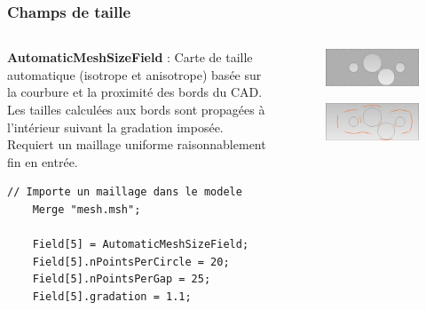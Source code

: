 \documentclass[aspectratio=169]{beamer}
\begin{document}
\begin{frame}[fragile]
\frametitle{Champs de taille}
\begin{columns}
  \begin{column}{0.55\textwidth}
    \footnotesize
    \textbf{AutomaticMeshSizeField} : Carte de taille automatique (isotrope et anisotrope) basée sur la courbure et la proximité des bords du CAD. Les tailles calculées aux bords sont propagées à l'intérieur suivant la gradation imposée. Requiert un maillage uniforme raisonnablement fin en entrée.
    \begin{lstlisting}[frame=none]
    // Importe un maillage dans le modele
    Merge "mesh.msh";

    Field[5] = AutomaticMeshSizeField;
    Field[5].nPointsPerCircle = 20;
    Field[5].nPointsPerGap = 25;
    Field[5].gradation = 1.1;
    \end{lstlisting}
  \end{column}
  \begin{column}{0.4\textwidth}
    \vspace{-0.7cm}
    \begin{figure}
      \includegraphics[width=1.02\textwidth]{figures/uniform.png}
      \caption{}
    \end{figure}
    \vspace{-2.3cm}
    \begin{figure}
      \includegraphics[width=1.02\textwidth]{figures/skeleton.png}
      \caption{}
    \end{figure}

\end{column}
\end{columns}
\end{frame}
\end{document}
